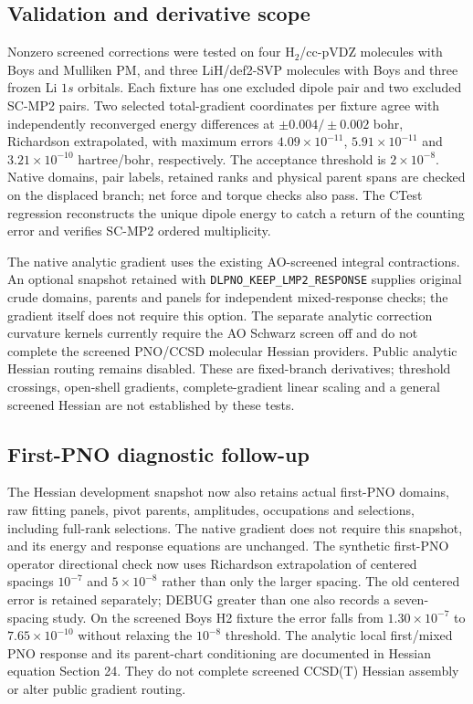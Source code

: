 \documentclass[11pt]{article}
\begin{document}
\subsection{Validation and derivative scope}
Nonzero screened corrections were tested on four H$_2$/cc-pVDZ molecules
with Boys and Mulliken PM, and three LiH/def2-SVP molecules with Boys and
three frozen Li $1s$ orbitals. Each fixture has one excluded dipole pair
and two excluded SC-MP2 pairs. Two selected total-gradient coordinates per
fixture agree with independently reconverged energy differences at
$\pm0.004/\pm0.002$ bohr, Richardson extrapolated, with maximum errors
$4.09\times10^{-11}$, $5.91\times10^{-11}$ and $3.21\times10^{-10}$
hartree/bohr, respectively. The acceptance threshold is $2\times10^{-8}$.
Native domains, pair labels, retained ranks and physical parent spans are
checked on the displaced branch; net force and torque checks also pass.
The CTest regression reconstructs the unique dipole energy to catch a
return of the counting error and verifies SC-MP2 ordered multiplicity.

The native analytic gradient uses the existing AO-screened integral
contractions. An optional snapshot retained with
\texttt{DLPNO\_KEEP\_LMP2\_RESPONSE} supplies original crude domains,
parents and panels for independent mixed-response checks; the gradient
itself does not require this option. The separate analytic correction
curvature kernels currently require the AO Schwarz screen off and do not
complete the screened PNO/CCSD molecular Hessian providers. Public analytic
Hessian routing remains disabled. These are fixed-branch derivatives;
threshold crossings, open-shell gradients, complete-gradient linear
scaling and a general screened Hessian are not established by these tests.
\subsection{First-PNO diagnostic follow-up}
The Hessian development snapshot now also retains actual first-PNO domains,
raw fitting panels, pivot parents, amplitudes, occupations and selections,
including full-rank selections. The native gradient does not require this
snapshot, and its energy and response equations are unchanged.
The synthetic first-PNO operator directional check now uses Richardson
extrapolation of centered spacings $10^{-7}$ and $5\times10^{-8}$ rather
than only the larger spacing. The old centered error is retained separately;
DEBUG greater than one also records a seven-spacing study. On the screened
Boys H2 fixture the error falls from $1.30\times10^{-7}$ to
$7.65\times10^{-10}$ without relaxing the $10^{-8}$ threshold.
The analytic local first/mixed PNO response and its parent-chart conditioning
are documented in Hessian equation Section 24. They do not complete screened
CCSD(T) Hessian assembly or alter public gradient routing.
\end{document}
